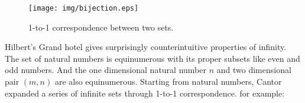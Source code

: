 \documentclass{article}
\begin{document}
\begin{figure}[htbp]
 \centering
 \texttt{[image: img/bijection.eps]}
 \caption{1-to-1 correspondence between two sets.}
 \label{fig:bijection}
\end{figure}

Hilbert's Grand hotel gives surprisingly counterintuitive properties of infinity. The set of natural numbers is equinumerous with its proper subsets like even and odd numbers. And the one dimensional natural number $n$ and two dimensional pair $(m, n)$ are also equinumerous. Starting from natural numbers, Cantor expanded a series of infinite sets through 1-to-1 correspondence. for example:
\end{document}
